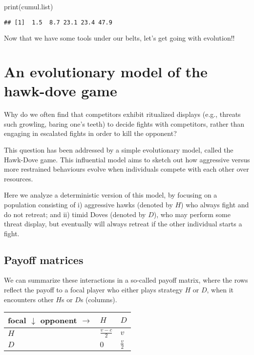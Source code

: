 \documentclass[
]{book}
\newenvironment{Shaded}{\begin{snugshade}}{\end{snugshade}}
\newcommand{\FunctionTok}[1]{\textcolor[rgb]{0.00,0.00,0.00}{#1}}
\newcommand{\NormalTok}[1]{#1}
\begin{document}
\begin{Shaded}
\begin{Highlighting}[]
\FunctionTok{print}\NormalTok{(cumul.list)}
\end{Highlighting}
\end{Shaded}

\begin{verbatim}
## [1]  1.5  8.7 23.1 23.4 47.9
\end{verbatim}

Now that we have some tools under our belts, let's get going with evolution!!

\hypertarget{an-evolutionary-model-of-the-hawk-dove-game}{%
\chapter{An evolutionary model of the hawk-dove game}\label{an-evolutionary-model-of-the-hawk-dove-game}}

Why do we often find that competitors
exhibit ritualized displays
(e.g., threats such growling, baring one's teeth)
to decide fights with competitors,
rather than engaging in escalated fights in order to kill the opponent?

This question has been addressed by a simple evolutionary model,
called the Hawk-Dove game. This influential model aims to sketch out how
aggressive versus more restrained behaviours evolve
when individuals compete with each other over resources.

Here we analyze a deterministic version of this
model, by focusing on a population consisting of i) aggressive hawks (denoted by \(H\)) who
always fight and do not retreat; and ii) timid Doves (denoted by \(D\)), who may perform some
threat display, but eventually will always retreat if the other individual
starts a fight.

\hypertarget{payoff-matrices}{%
\section{Payoff matrices}\label{payoff-matrices}}

We can summarize these interactions in a so-called payoff matrix, where the rows
reflect the payoff to a focal player who either plays strategy \(H\) or \(D\), when it encounters other \(H\)s or \(D\)s (columns).

\begin{longtable}[]{@{}lll@{}}
\toprule
focal \(\downarrow\) opponent \(\rightarrow\) & \(H\) & \(D\) \\
\midrule
\endhead
\(H\) & \(\frac{v-c}{2}\) & \(v\) \\
\(D\) & \(0\) & \(\frac{v}{2}\) \\
\bottomrule
\end{longtable}
\end{document}
